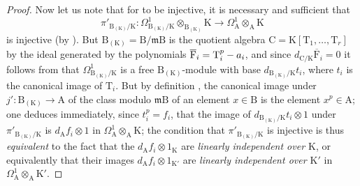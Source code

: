 \begin{proof}
Now let us note that for  to be injective, it is necessary and sufficient that
\[
  \pi'_{\mathrm{B}_{(\mathrm{K})}/\mathrm{K}}:\Omega^1_{\mathrm{B}_{(\mathrm{K})}/\mathrm{K}}\otimes_{\mathrm{B}_{(\mathrm{K})}}\mathrm{K}\to\Omega^1_\mathrm{A}\otimes_\mathrm{A}\mathrm{K}
\]
is injective (by ).
But $\mathrm{B}_{(\mathrm{K})}=\mathrm{B}/\mathfrak{m}\mathrm{B}$ is the quotient algebra $\mathrm{C}=\mathrm{K}[\mathrm{T}_1,\ldots,\mathrm{T}_r]$ by the ideal generated by the polynomials $\overline{\mathrm{F}}_i=\mathrm{T}_i^p- a_i$, and since $d_{\mathrm{C}/\mathrm{K}}\overline{\mathrm{F}}_i=0$ it follows from  that $\Omega^1_{\mathrm{B}_{(\mathrm{K})}/\mathrm{K}}$ is a free $\mathrm{B}_{(\mathrm{K})}$-module with base $d_{\mathrm{B}_{(\mathrm{K})}/\mathrm{K}}t_i$, where $t_i$ is the canonical image of $\mathrm{T}_i$.
But by definition , the canonical image under $j':\mathrm{B}_{(\mathrm{K})}\to\mathrm{A}$ of the class modulo $\mathfrak{m}\mathrm{B}$ of an element $x\in\mathrm{B}$ is the element $x^p\in\mathrm{A}$; one deduces immediately, since $t_i^p=f_i$, that the image of $d_{\mathrm{B}_{(\mathrm{K})}/\mathrm{K}}t_i\otimes 1$ under $\pi'_{\mathrm{B}_{(\mathrm{K})}/\mathrm{K}}$ is $d_\mathrm{A}f_i\otimes 1$ in $\Omega^1_\mathrm{A}\otimes_\mathrm{A}\mathrm{K}$; the condition that $\pi'_{\mathrm{B}_{(\mathrm{K})}/\mathrm{K}}$ is injective is thus \emph{equivalent} to the fact that the $d_\mathrm{A}f_i\otimes 1_\mathrm{K}$ are \emph{linearly independent over $\mathrm{K}$}, or equivalently that their images $d_\mathrm{A}f_i\otimes 1_{\mathrm{K}'}$ are \emph{linearly independent over $\mathrm{K}'$} in $\Omega^1_\mathrm{A}\otimes_\mathrm{A}\mathrm{K}'$.


\end{proof}
